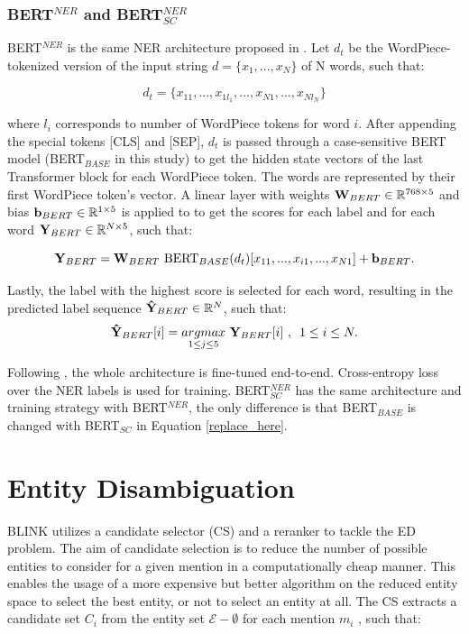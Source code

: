 \documentclass{report}
\theoremstyle{definition}
\theoremstyle{remark}
\begin{document}
\subsubsection{BERT$^{NER}$ and BERT$^{NER}_{SC}$}
BERT$^{NER}$ is the same NER architecture proposed in \cite{BERT}. Let $d_t$ be the WordPiece-tokenized version of the input string $d=\{x_1,...,x_N\}$ of N words, such that:

\begin{equation}
    d_t = \{x_{11},...,x_{1l_{1}},...,x_{N1},...,x_{Nl_{N}}\}
\end{equation}

\noindent where $l_i$ corresponds to number of WordPiece tokens for word $i$. After appending the special tokens [CLS] and [SEP], $d_t$ is passed through a case-sensitive BERT model (BERT$_{BASE}$ in this study) to get the hidden state vectors of the last Transformer block for each WordPiece token. The words are represented by their first WordPiece token's vector. A linear layer with weights $\bold{W}_{BERT} \in \mathbb{R}^{768\times5}$ and bias $\bold{b}_{BERT} \in \mathbb{R}^{1\times5}$ is applied to to get the scores for each label and for each word $\bold{Y}_{BERT} \in \mathbb{R}^{N\times5}$, such that:

\begin{equation}
\label{replace_here}
   \bold{Y}_{BERT} = \bold{W}_{BERT} \ \text{BERT}_{BASE}(d_t)[x_{11},...,x_{i1},...,x_{N1}] + \bold{b}_{BERT}.
\end{equation}

Lastly, the label with the highest score is selected for each word, resulting in the predicted label sequence $\bold{\Hat{Y}}_{BERT} \in \mathbb{R}^N$, such that:
\begin{equation}
    \bold{\Hat{Y}}_{BERT}[i] = \underset{1\leq j\leq5}{argmax} \ \bold{Y}_{BERT} [i] \ \text{, } \ 1\leq i \leq N. 
\end{equation}

Following \cite{BERT}, the whole architecture is fine-tuned end-to-end. Cross-entropy loss over the NER labels is used for training. BERT$^{NER}_{SC}$ has the same architecture and training strategy with BERT$^{NER}$, the only difference is that BERT$_{BASE}$ is changed with BERT$_{SC}$ in Equation \ref{replace_here}.

\section{Entity Disambiguation}
\label{sec:entdismethod}
BLINK utilizes a candidate selector (CS) and a reranker to tackle the ED problem. The aim of candidate selection is to reduce the number of possible entities to consider for a given mention in a computationally cheap manner. This enables the usage of a more expensive but better algorithm on the reduced entity space to select the best entity, or not to select an entity at all. The CS extracts a candidate set $C_i$ from the entity set $\mathcal{E} - \emptyset$ for each mention $m_i$ , such that:
\end{document}
